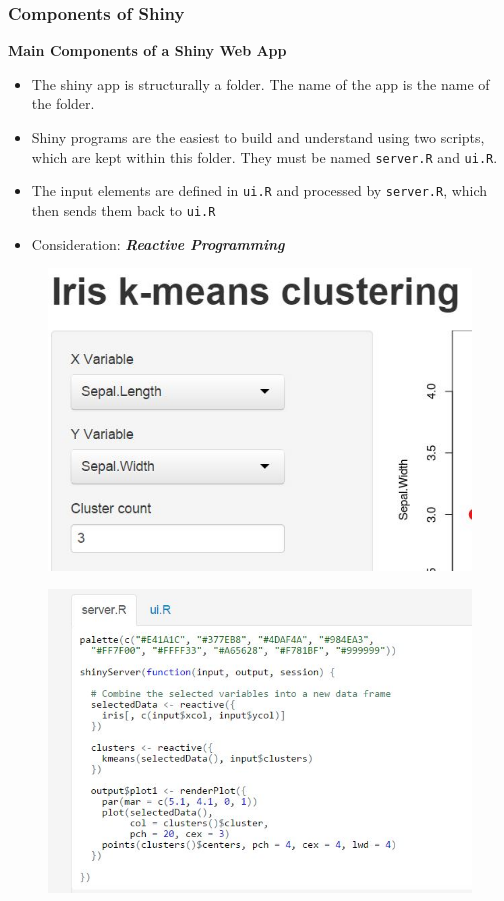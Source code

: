 \documentclass{beamer}
\begin{document}
\begin{frame}
	\frametitle{Components of Shiny}
	\Large
	\textbf{Main Components of a Shiny Web App} 
	\begin{itemize}
		\item The shiny app is structurally a folder. The name of the app is the name of the folder.
		\item  Shiny programs are the easiest to build and
		understand using two scripts, which are kept within this folder. They must be
		named \texttt{server.R} and \texttt{ui.R}.
		\item 
		The input elements are defined in
		\texttt{ui.R} and processed by \texttt{server.R}, which then sends them back to \texttt{ui.R}
		\item Consideration: \textbf{\textit{Reactive Programming}}
	\end{itemize}
	
	
\end{frame}
\begin{frame}
\begin{figure}
\centering
\includegraphics[width=0.9\linewidth]{00-sidebar}

\end{figure}

\end{frame}
\begin{frame}
	\begin{figure}
\centering
\includegraphics[width=0.9\linewidth]{00-server}

\end{figure}

\end{frame}
\end{document}

